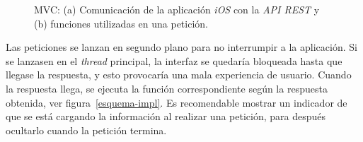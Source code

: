 \begin{figure}[p]
\centering
{}
\caption{MVC: (a) Comunicación de la aplicación \textit{iOS} con la \textit{API REST} y (b) funciones utilizadas en una petición.}
\end{figure}

Las peticiones se lanzan en segundo plano para no interrumpir a la aplicación.
Si se lanzasen en el \textit{thread} principal, la interfaz se quedaría bloqueada hasta que llegase la respuesta, y esto provocaría una mala experiencia de usuario. Cuando la respuesta llega, se ejecuta la función correspondiente según la respuesta obtenida, ver figura~\ref{esquema-impl}. Es recomendable mostrar un indicador de que se está cargando la información al realizar una petición, para después ocultarlo cuando la petición termina.

